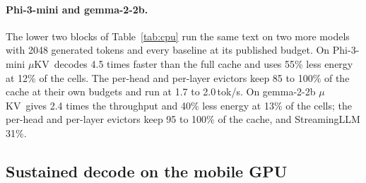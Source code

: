 \documentclass[sigconf, anonymous=false, screen=true]{acmart}
\newcommand{\muKV}{$\mu$KV}
\begin{document}
\paragraph{Phi-3-mini and gemma-2-2b.} The lower two blocks of Table~\ref{tab:cpu} run the same text on two more models with 2048 generated tokens and every baseline at its published budget. On Phi-3-mini \muKV\ decodes 4.5 times faster than the full cache and uses 55\% less energy at 12\% of the cells. The per-head and per-layer evictors keep 85 to 100\% of the cache at their own budgets and run at 1.7 to 2.0\,tok/s. On gemma-2-2b \muKV\ gives 2.4 times the throughput and 40\% less energy at 13\% of the cells; the per-head and per-layer evictors keep 95 to 100\% of the cache, and StreamingLLM 31\%.

\subsection{Sustained decode on the mobile GPU}
\label{sec:eval-gpu}
\end{document}
